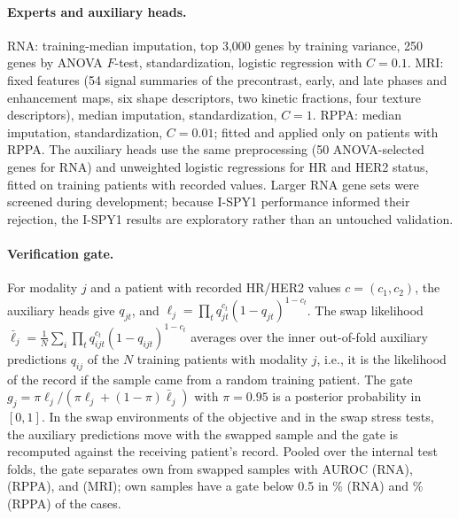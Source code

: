 \documentclass[a4paper,runningheads]{llncs}
\begin{document}
\paragraph{Experts and auxiliary heads.} RNA: training-median imputation, top 3{,}000 genes by training variance, 250 genes by ANOVA $F$-test, standardization, logistic regression with $C=0.1$. MRI: \NMriFeat{} fixed features (54 signal summaries of the precontrast, early, and late phases and enhancement maps, six shape descriptors, two kinetic fractions, four texture descriptors), median imputation, standardization, $C=1$. RPPA: median imputation, standardization, $C=0.01$; fitted and applied only on patients with RPPA. The auxiliary heads use the same preprocessing (50 ANOVA-selected genes for RNA) and unweighted logistic regressions for HR and HER2 status, fitted on training patients with recorded values. Larger RNA gene sets were screened during development; because I-SPY1 performance informed their rejection, the I-SPY1 results are exploratory rather than an untouched validation.

\paragraph{Verification gate.} For modality $j$ and a patient with recorded HR/HER2 values $c=(c_1,c_2)$, the auxiliary heads give $q_{jt}$, and $\ell_j=\prod_t q_{jt}^{c_t}(1-q_{jt})^{1-c_t}$. The swap likelihood $\bar\ell_j=\frac1N\sum_{i}\prod_t q_{ijt}^{c_t}(1-q_{ijt})^{1-c_t}$ averages over the inner out-of-fold auxiliary predictions $q_{ij}$ of the $N$ training patients with modality $j$, i.e., it is the likelihood of the record if the sample came from a random training patient. The gate $g_j=\pi\ell_j/(\pi\ell_j+(1-\pi)\bar\ell_j)$ with $\pi=0.95$ is a posterior probability in $[0,1]$. In the swap environments of the objective and in the swap stress tests, the auxiliary predictions move with the swapped sample and the gate is recomputed against the receiving patient's record. Pooled over the internal test folds, the gate separates own from swapped samples with AUROC \GateAucRna{} (RNA), \GateAucRppa{} (RPPA), and \GateAucMri{} (MRI); own samples have a gate below 0.5 in \GateLowTrueRna\% (RNA) and \GateLowTrueRppa\% (RPPA) of the cases.
\end{document}
